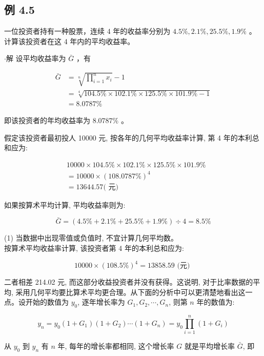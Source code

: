 \documentclass[10pt]{article}
\begin{document}
\begin{CJK*}{UTF8}{bsmi}
\section*{例 4.5}
一位投资者持有一种股票，连续 4 年的收益率分别为 $4.5 \%, 2.1 \%, 25.5 \%, 1.9 \%$ 。计算该投资者在这 4 年内的平均收益率。

$\cdot$解 设平均收益率为 $\bar{G}$ ，有

$$
\begin{aligned}
\bar{G} & =\sqrt[n]{\prod_{i=1}^{n} x_{i}}-1 \\
& =\sqrt[4]{104.5 \% \times 102.1 \% \times 125.5 \% \times 101.9 \%-1} \\
& =8.0787 \%
\end{aligned}
$$

即该投资者的年均收益率为 $8.0787 \%$ 。

假定该投资者最初投人 10000 元, 按各年的几何平均收益率计算, 第 4 年的本利总和应为:

$$
\begin{aligned}
& 10000 \times 104.5 \% \times 102.1 \% \times 125.5 \% \times 101.9 \% \\
& =10000 \times(108.0787 \%)^{4} \\
& =13644.57(\text { 元) }
\end{aligned}
$$

如果按算术平均计算, 平均收益率则为:

$$
\bar{G}=(4.5 \%+2.1 \%+25.5 \%+1.9 \%) \div 4=8.5 \%
$$

(1) 当数据中出现零值或负值时, 不宜计算几何平均数。\\
按算术平均收益率计算, 该投资者第 4 年的本利总和应为:

$$
10000 \times(108.5 \%)^{4}=13858.59 \text { (元) }
$$

二者相差 214.02 元, 而这部分收益投资者并没有获得。这说明, 对于比率数据的平均, 采用几何平均要比算术平均更合理。从下面的分析中可以更清楚地看出这一点。设开始的数值为 $y_{0}$, 逐年增长率为 $G_{1}, G_{2}, \cdots, G_{n}$, 则第 $n$ 年的数值为:


\begin{equation*}
y_{n}=y_{0}\left(1+G_{1}\right)\left(1+G_{2}\right) \cdots\left(1+G_{n}\right)=y_{0} \prod_{i=1}^{n}\left(1+G_{i}\right) \tag{4.6}
\end{equation*}


从 $y_{0}$ 到 $y_{n}$ 有 $n$ 年, 每年的增长率都相同, 这个增长率 $G$ 就是平均增长率 $\bar{G}$, 即

\begin{center}
\end{center}



\end{CJK*}
\end{document}
